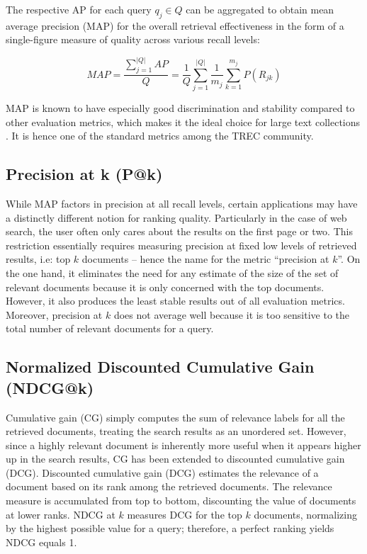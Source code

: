 The respective AP for each query $ q_{j} \in Q $ can be aggregated to obtain mean average precision (MAP) for the overall retrieval effectiveness in the form of a single-figure measure of quality across various recall levels:

\begin{equation}
MAP = \frac{\sum^{|Q|} _{j = 1} AP}{Q} = \frac{1}{Q} \sum^{|Q|} _{j = 1} \frac{1}{m_j} \sum^{m_j} _{k = 1} P(R_{jk})
\end{equation}


MAP is known to have especially good discrimination and stability compared to other evaluation metrics, which makes it the ideal choice for large text collections \cite{manning2010introduction}.
It is hence one of the standard metrics among the TREC community.

\subsection{Precision at k (P@k)}

While MAP factors in precision at all recall levels, certain applications may have a distinctly different notion for ranking quality.
Particularly in the case of web search, the user often only cares about the results on the first page or two.
This restriction essentially requires measuring precision at fixed low levels of retrieved results, i.e: top $ k $ documents -- hence the name for the metric ``precision at $ k $''.
On the one hand, it eliminates the need for any estimate of the size of the set of relevant documents because it is only concerned with the top documents.
However, it also produces the least stable results out of all evaluation metrics.
Moreover, precision at $ k $ does not average well because it is too sensitive to the total number of relevant documents for a query.

\subsection{Normalized Discounted Cumulative Gain (NDCG@k)}

Cumulative gain (CG) simply computes the sum of relevance labels for all the retrieved documents, treating the search results as an unordered set.
However, since a highly relevant document is inherently more useful when it appears higher up in the search results, CG has been extended to discounted cumulative gain (DCG).
Discounted cumulative gain (DCG) estimates the relevance of a document based on its rank among the retrieved documents.
The relevance measure is accumulated from top to bottom, discounting the value of documents at lower ranks.
NDCG at $ k $ measures DCG for the top $ k $ documents, normalizing by the highest possible value for a query; therefore, a perfect ranking yields NDCG equals 1.


